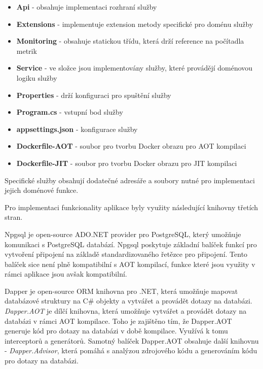   \begin{itemize}
    \item \textbf{Api} - obsahuje implementaci rozhraní služby
    \item \textbf{Extensions} - implementuje extension metody specifické pro doménu služby
    \item \textbf{Monitoring} - obsahuje statickou třídu, která drží reference na počítadla metrik
    \item \textbf{Service} - ve složce jsou implementovány služby, které provádějí doménovou logiku služby
    \item \textbf{Properties} - drží konfiguraci pro spuštění služby
    \item \textbf{Program.cs} - vstupní bod služby
    \item \textbf{appsettings.json} - konfigurace služby
    \item \textbf{Dockerfile-AOT} - soubor pro tvorbu Docker obrazu pro AOT kompilaci
    \item \textbf{Dockerfile-JIT} - soubor pro tvorbu Docker obrazu pro JIT kompilaci
\end{itemize}

Specifické služby obsahují dodatečné adresáře a soubory nutné pro implementaci jejich doménové funkce.


Pro implementaci funkcionality aplikace byly využity následující knihovny třetích stran.


Npgsql je open-source ADO.NET provider pro PostgreSQL, který umožňuje komunikaci s PostgreSQL databází. Npgsql poskytuje základní balíček funkcí pro vytvoření připojení na základě standardizovaného řetězce pro připojení. Tento balíček sice není plně kompatibilní s AOT kompilací, funkce které jsou využity v rámci aplikace jsou avšak kompatibilní.


Dapper je open-source ORM knihovna pro .NET, která umožňuje mapovat databázové struktury na C\# objekty a vytvářet a provádět dotazy na databázi. \emph{Dapper.AOT} je dílčí knihovna, která umožňuje vytvářet a provádět dotazy na databázi v rámci AOT kompilace. Toho je zajištěno tím, že Dapper.AOT generuje kód pro dotazy na databázi v době kompilace. Využívá k tomu interceptorů a generátorů. Samotný balíček Dapper.AOT obsahuje další knihovnu - \emph{Dapper.Advisor}, která pomáhá s analýzou zdrojového kódu a generováním kódu pro dotazy na databázi.

